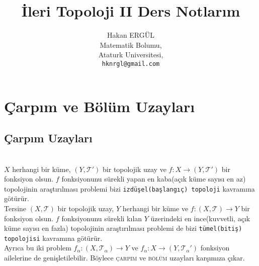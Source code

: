 \documentclass[11pt, a4paper]{article}
\begin{document}
\title{\.{I}leri Topoloji II Ders Notlar{\i}m}
\author{Hakan ERG\"{U}L\\
  Matematik Bolumu,\\
  Ataturk Universitesi,\\
  \texttt{hknrgl@gmail.com}}
\maketitle
\section*{\c{C}arp{\i}m ve B\"{o}l\"{u}m Uzaylar{\i}}
\subsection*{\c{C}arp{\i}m Uzaylar{\i}}
\label{sec:carp_bol}
\vspace{5mm}\\
$X$ herhangi bir k\"{u}me, $(Y,\mathcal{T}')$ bir topolojik uzay ve $f:X\to (Y,\mathcal{T}')$ bir fonksiyon olsun. $f$ fonksiyonunu s\"{u}rekli yapan en kaba(a\c{c}{\i}k k\"{u}me say{\i}s{\i} en az) topolojinin ara\c{s}t{\i}r{\i}lmas{\i} problemi bizi \texttt{izd\"{u}\c{s}el(ba\c{s}lang{\i}\c{c}) topoloji} kavram{\i}na g\"{o}t\"{u}r\"{u}r.
\vspace{1mm}\\

Tersine $(X,\mathcal{T})$ bir topolojik uzay, $Y$ herhangi bir k\"{u}me ve $f:(X,\mathcal{T})\to Y$ bir fonksiyon olsun. $f$ fonksiyonunu s\"{u}rekli k{\i}lan $Y$ \"{u}zerindeki en ince(kuvvetli, a\c{c}{\i}k k\"{u}me say{\i}s{\i} en fazla) topolojinin ara\c{s}t{\i}r{\i}lmas{\i} problemi de bizi \texttt{t\"{u}mel(biti\c{s}) topolojisi} kavram{\i}na g\"{o}t\"{u}r\"{u}r.
\vspace{1mm}\\

Ayr{\i}ca bu iki problem $f_\alpha:(X,\mathcal{T}_\alpha)\to Y$ ve $f_\alpha:X\to (Y,\mathcal{T}_\alpha')$ fonksiyon ailelerine de geni\c{s}letilebilir. B\"{o}ylece \textsc{\c{c}arp{\i}m} ve \textsc{b\"{o}l\"{u}m} uzaylar{\i} kar\c{s}{\i}m{\i}za \c{c}{\i}kar.
\end{document}
